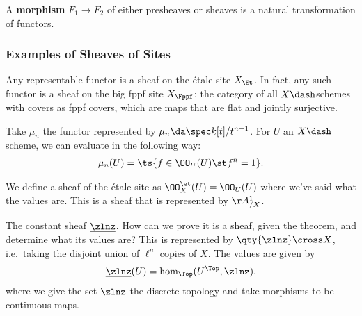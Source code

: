 \begin{definition}

A \textbf{morphism} \(F_1\to F_2\) of either presheaves or sheaves is a
natural transformation of functors.

\end{definition}

\hypertarget{examples-of-sheaves-of-sites}{%
\subsubsection{Examples of Sheaves of
Sites}\label{examples-of-sheaves-of-sites}}

\begin{theorem}[?]

Any representable functor is a sheaf on the étale site \(X_{\Et}\). In
fact, any such functor is a sheaf on the big fppf site \(X_{\Fppf}\):
the category of all \(X\dash\)schemes with covers as fppf covers, which
are maps that are flat and jointly surjective.

\end{theorem}

\begin{example}

Take \(\mu_n\) the functor represented by
\(\mu_n \da \spec k[t] / t^{n-1}\). For \(U\) an \(X\dash\)scheme, we
can evaluate in the following way:
\begin{align*}  
\mu_n(U) = \ts{f\in \OO_U(U) \st f^n = 1}
.\end{align*}

\end{example}

\begin{example}[?]

We define a sheaf of the étale site as \(\OO^{\et}_X(U) = \OO_U(U)\)
where we've said what the values are. This is a sheaf that is
represented by \(\AA^1_{/X}\).

\end{example}

\begin{example}[?]

The constant sheaf \(\underline{\zlnz}\). How can we prove it is a
sheaf, given the theorem, and determine what its values are? This is
represented by \(\qty{\zlnz} \cross X\), i.e.~taking the disjoint union
of \(\ell^n\) copies of \(X\). The values are given by
\begin{align*}  
\underline{\zlnz}(U) =  \hom_{\Top}(U^{\Top}, \zlnz)
,\end{align*} where we give the set \(\zlnz\) the discrete topology and
take morphisms to be continuous maps.

\end{example}

